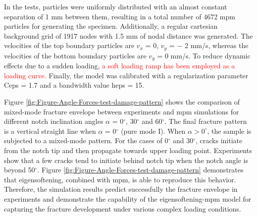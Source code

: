 \documentclass[preprint,12pt,a4paper]{elsarticle}
\newcommand{\PNA}[1]{
  \textcolor{red}{{#1}}
}
\begin{document}
In the tests, particles were uniformly distributed with an almost
constant separation of 1 mm between them, resulting in a total number of 4672
\acrshort{mpm} particles for generating the specimen. Additionally, a
regular cartesian background grid of 1917 nodes with 1.5 mm of nodal distance
was generated. The velocities of the top boundary particles are $v_x$ = 0, $v_y$ = −
2 mm/s, whereas the velocities of the bottom boundary particles are
$v_y$ = 0 mm/s. To reduce dynamic effects due to a sudden loading, \PNA{a soft loading ramp has been employed as a loading curve.} Finally, the model was
calibrated with a regularization parameter \gls{Ceps} = 1.7 and a
bandwidth value \gls{heps} = 15.

Figure \ref{fig:Figure-Angle-Forces-test-damage-pattern} shows the
comparison of mixed-mode fracture envelope between experiments and
\acrshort{mpm} simulations for different notch inclination angles
$\alpha$ = 0$^{\circ}$, 30$^{\circ}$ and 60$^{\circ}$. The final
fracture pattern is a vertical straight line when $\alpha$ = 0$^{\circ}$  (pure mode I). 
When $\alpha > 0^{\circ}$, the sample is
subjected to a mixed-mode pattern. For the cases of 0$^{\circ}$ and 30$^{\circ}$, cracks
initiate from the notch tip and then propagate towards upper loading
point. Experiments show that a few cracks tend to initiate behind
notch tip when the notch angle is beyond 50$^{\circ}$. Figure
\ref{fig:Figure-Angle-Forces-test-damage-pattern} demonstrates that
eigensoftening, combined with \acrshort{mpm}, is able to reproduce this
behavior. Therefore, the simulation results predict successfully the
fracture envelope in experiments and demonstrate the capability of
the eigensoftening-\acrshort{mpm} model for capturing the fracture
development under various complex loading conditions. 
\end{document}
